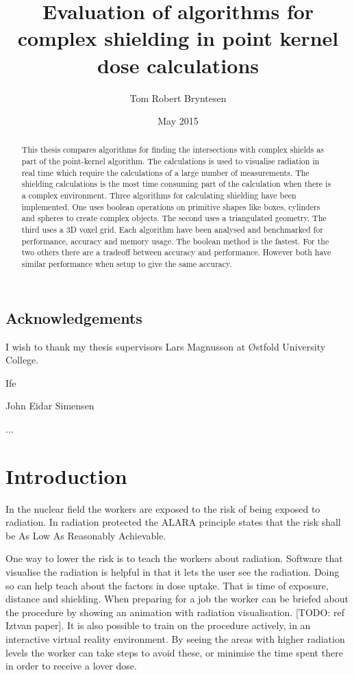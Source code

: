 \documentclass[11pt,twoside,a4paper]{report}
\begin{document}
\title{Evaluation of algorithms for complex shielding in point kernel dose calculations}
\author{Tom Robert Bryntesen}
\date{May 2015}
\maketitle

\begin{abstract}
This thesis compares algorithms for finding the intersections with complex shields as part of the point-kernel algorithm. The calculations is used to visualise radiation in real time which require the calculations of a large number of measurements. The shielding calculations is the most time consuming part of the calculation when there is a complex environment. Three algorithms for calculating shielding have been implemented. One uses boolean operations on primitive shapes like boxes, cylinders and spheres to create complex objects. The second uses a triangulated geometry. The third uses a 3D voxel grid. Each algorithm have been analysed and benchmarked for performance, accuracy and memory usage. The boolean method is the fastest. For the two others there are a tradeoff between accuracy and performance. However both have similar performance when setup to give the same accuracy.

\end{abstract}

\section{Acknowledgements}
I wish to thank my thesis supervisors Lars Magnusson at Østfold University College.

Ife

John Eidar Simensen

...

\tableofcontents

\chapter{Introduction}
In the nuclear field the workers are exposed to the risk of being exposed to radiation. In radiation protected the ALARA principle states that the risk shall be As Low As Reasonably Achievable. 

One way to lower the risk is to teach the workers about radiation. Software that visualise the radiation is helpful in that it lets the user see the radiation. Doing so can help teach about the factors in dose uptake. That is time of exposure, distance and shielding. When preparing for a job the worker can be briefed about the procedure by showing an animation with radiation visualisation. [TODO: ref Iztvan paper].  It is also possible to train on the procedure actively, in an interactive virtual reality environment. By seeing the areas with higher radiation levels the worker can take steps to avoid these, or minimise the time spent there in order to receive a lover dose. 
\end{document}
